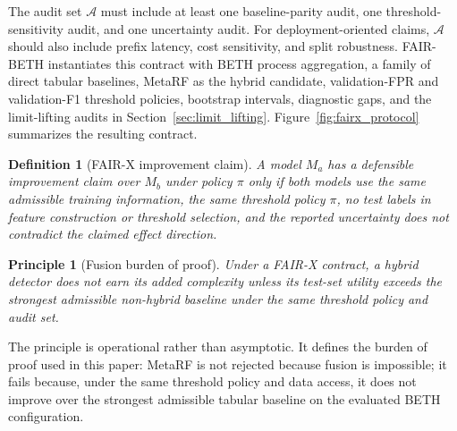 \documentclass[10pt,journal,compsoc]{IEEEtran}
\newtheorem{definition}{Definition}
\newtheorem{principle}{Principle}
\begin{document}
The audit set $\mathcal{A}$ must include at least one baseline-parity audit, one threshold-sensitivity audit, and one uncertainty audit. For deployment-oriented claims, $\mathcal{A}$ should also include prefix latency, cost sensitivity, and split robustness. FAIR-BETH instantiates this contract with BETH process aggregation, a family of direct tabular baselines, MetaRF as the hybrid candidate, validation-FPR and validation-F1 threshold policies, bootstrap intervals, diagnostic gaps, and the limit-lifting audits in Section~\ref{sec:limit_lifting}. Figure~\ref{fig:fairx_protocol} summarizes the resulting contract.

\begin{definition}[FAIR-X improvement claim]
A model $M_a$ has a defensible improvement claim over $M_b$ under policy $\pi$ only if both models use the same admissible training information, the same threshold policy $\pi$, no test labels in feature construction or threshold selection, and the reported uncertainty does not contradict the claimed effect direction.
\end{definition}

\begin{principle}[Fusion burden of proof]
Under a FAIR-X contract, a hybrid detector does not earn its added complexity unless its test-set utility exceeds the strongest admissible non-hybrid baseline under the same threshold policy and audit set.
\end{principle}

The principle is operational rather than asymptotic. It defines the burden of proof used in this paper: MetaRF is not rejected because fusion is impossible; it fails because, under the same threshold policy and data access, it does not improve over the strongest admissible tabular baseline on the evaluated BETH configuration.
\end{document}
